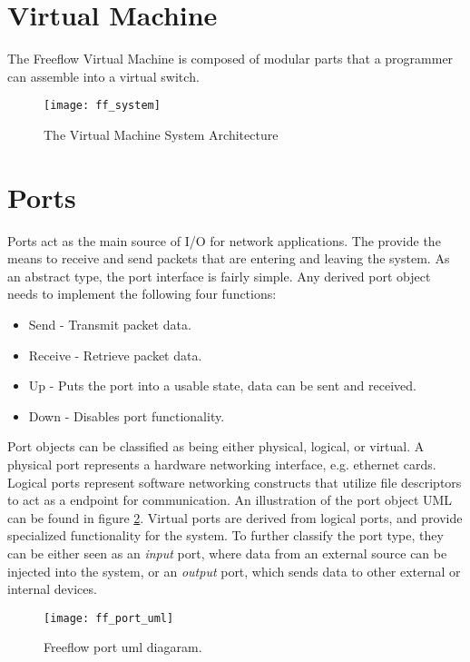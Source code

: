 \section{Virtual Machine}
\label{vm}
The Freeflow Virtual Machine is composed of modular parts that a programmer can
assemble into a virtual switch.

\begin{figure}[h]
\centering
\texttt{[image: ff\_system]}
\caption{The Virtual Machine System Architecture}
\label{fig:ff_system}
\end{figure}

\section{Ports}
\label{vm:port}
Ports act as the main source of I/O for network applications. The provide the
means to receive and send packets that are entering and leaving the system. As
an abstract type, the port interface is fairly simple. Any derived port object
needs to implement the following four functions:

\begin{itemize}
\item Send - Transmit packet data.
\item Receive - Retrieve packet data.
\item Up - Puts the port into a usable state, data can be sent and received.
\item Down - Disables port functionality.
\end{itemize}

Port objects can be classified as being either physical, logical, or virtual. A
physical port represents a hardware networking interface, e.g. ethernet cards.
Logical ports represent software networking constructs that utilize file
descriptors to act as a endpoint for communication. An illustration of the port
object UML can be found in figure \ref{port_uml}. Virtual ports are derived
from logical ports, and provide specialized functionality for the system. To
further classify the port type, they can be either seen as an \emph{input} 
port, where data from an external source can be injected into the system, or an
\emph{output} port, which sends data to other external or internal devices.

\begin{figure}[h]
\centering
\texttt{[image: ff\_port\_uml]}
\caption{Freeflow port uml diagaram.}
\label{port_uml}
\end{figure}

